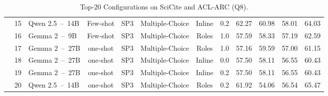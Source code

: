 \begin{table*}[t]
\begin{tabular}{cllccccccccc}
                                    & 15                & Qwen 2.5~--~14B       & Few-shot      & SP3             & Multiple-Choice         & Inline        & 0.2           & 62.27                 & 60.98             & 58.01                 & 64.03                 \\
                                    & 16                & Gemma 2~--~9B         & Few-shot      & SP3             & Multiple-Choice         & Roles         & 1.0           & 57.59                 & 58.33             & 57.19                 & 62.59                 \\
                                    & 17                & Gemma 2~--~27B        & one-shot      & SP3             & Multiple-Choice         & Roles         & 1.0           & 57.16                 & 59.59             & 57.00                 & 61.15                 \\
                                    & 18                & Gemma 2~--~27B        & one-shot      & SP3             & Multiple-Choice         & Inline        & 0.0           & 57.50                 & 58.11             & 56.55                 & 60.43                 \\
                                    & 19                & Gemma 2~--~27B        & one-shot      & SP3             & Multiple-Choice         & Inline        & 0.2           & 57.50                 & 58.11             & 56.55                 & 60.43                 \\
                                    & 20                & Qwen 2.5~--~14B       & one-shot      & SP3             & Multiple-Choice         & Roles         & 0.2           & 61.92                 & 54.06             & 56.54                 & 65.47                 \\

        \hline
    \end{tabular}
    \caption{Top-20 Configurations on SciCite and ACL-ARC (Q8).}
    \label{tab:appendix_top_20_configurations}
\end{table*}

